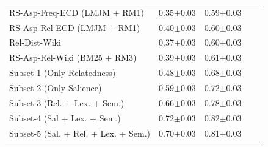 \begin{table}[t]
\begin{tabular}{@{}lllll@{}}
     
      RS-Asp-Freq-ECD (LMJM + RM1)  &     
      0.35$\pm$0.03 &
      0.59$\pm$0.03
      \\
      
       
      RS-Asp-Rel-ECD (LMJM + RM1) &     
      0.40$\pm$0.03 &
      0.60$\pm$0.03
      \\
       \midrule
      
      
      Rel-Dist-Wiki  &    
      0.37$\pm$0.03 &
      0.60$\pm$0.03
      \\
      
      
       
      RS-Asp-Rel-Wiki (BM25 + RM3)  &     
      0.39$\pm$0.03 &
      0.61$\pm$0.03
      \\
      \midrule
      
       Subset-1 (Only Relatedness) &
      0.48$\pm$0.03 &
      0.68$\pm$0.03
      \\
      
      
      Subset-2 (Only Salience) &
      0.59$\pm$0.03 &
      0.72$\pm$0.03
      \\
      
       Subset-3 (Rel. + Lex. + Sem.) &
      0.66$\pm$0.03 &
      0.78$\pm$0.03
      \\
      
       Subset-4 (Sal + Lex. + Sem.) &
      
      0.72$\pm$0.03 &
      0.82$\pm$0.03
      \\
      
      
      Subset-5 (Sal. + Rel. + Lex. + Sem.) &
      0.70$\pm$0.03 &
      0.81$\pm$0.03
      \\
     
      
      

     
      
       \bottomrule
    \end{tabular}
\end{table}





 

%


  